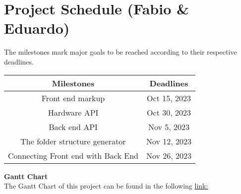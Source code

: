  \section{Project Schedule (Fabio \& Eduardo)}
 The milestones mark major goals to be reached according to their respective deadlines.
\begin{table}[H]
    \centering
    \begin{tabular}{||c | c||} 
        \hline
        \rowcolor{cyan}
        Milestones & Deadlines\\
        \hline
        Front end markup & Oct 15, 2023\\
        \hline
        Hardware API & Oct 30, 2023\\
        \hline
        Back end API & Nov 5, 2023\\
        \hline
        The folder structure generator & Nov 12, 2023\\
        \hline
        Connecting Front end with Back End & Nov 26, 2023\\
        \hline
    \end{tabular}
\end{table}
\textbf{Gantt Chart}\\
The Gantt Chart of this project can be found in the following \href{www.google.com}{link:}
